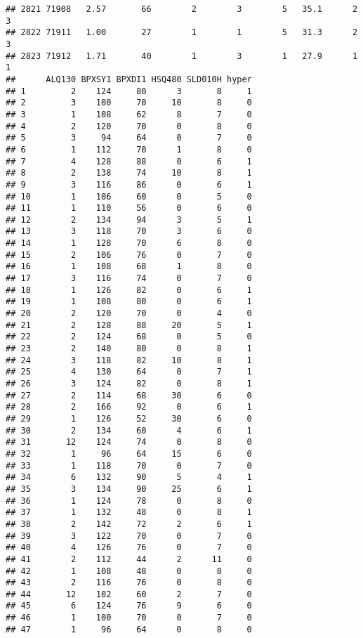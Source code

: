 \documentclass[
]{article}
\begin{document}
\begin{verbatim}
## 2821 71908   2.57       66        2        3        5   35.1      2      3
## 2822 71911   1.00       27        1        1        5   31.3      2      3
## 2823 71912   1.71       40        1        3        1   27.9      1      1
##      ALQ130 BPXSY1 BPXDI1 HSQ480 SLD010H hyper
## 1         2    124     80      3       8     1
## 2         3    100     70     10       8     0
## 3         1    108     62      8       7     0
## 4         2    120     70      0       8     0
## 5         3     94     64      0       7     0
## 6         1    112     70      1       8     0
## 7         4    128     88      0       6     1
## 8         2    138     74     10       8     1
## 9         3    116     86      0       6     1
## 10        1    106     60      0       5     0
## 11        1    110     56      0       6     0
## 12        2    134     94      3       5     1
## 13        3    118     70      3       6     0
## 14        1    128     70      6       8     0
## 15        2    106     76      0       7     0
## 16        1    108     68      1       8     0
## 17        3    116     74      0       7     0
## 18        1    126     82      0       6     1
## 19        1    108     80      0       6     1
## 20        2    120     70      0       4     0
## 21        2    128     88     20       5     1
## 22        2    124     68      0       5     0
## 23        2    140     80      0       8     1
## 24        3    118     82     10       8     1
## 25        4    130     64      0       7     1
## 26        3    124     82      0       8     1
## 27        2    114     68     30       6     0
## 28        2    166     92      0       6     1
## 29        1    126     52     30       6     0
## 30        2    134     60      4       6     1
## 31       12    124     74      0       8     0
## 32        1     96     64     15       6     0
## 33        1    118     70      0       7     0
## 34        6    132     90      5       4     1
## 35        3    134     90     25       6     1
## 36        1    124     78      0       8     0
## 37        1    132     48      0       8     1
## 38        2    142     72      2       6     1
## 39        3    122     70      0       7     0
## 40        4    126     76      0       7     0
## 41        2    112     44      2      11     0
## 42        1    108     48      0       8     0
## 43        2    116     76      0       8     0
## 44       12    102     60      2       7     0
## 45        6    124     76      9       6     0
## 46        1    100     70      0       7     0
## 47        1     96     64      0       8     0

\end{verbatim}
\end{document}
